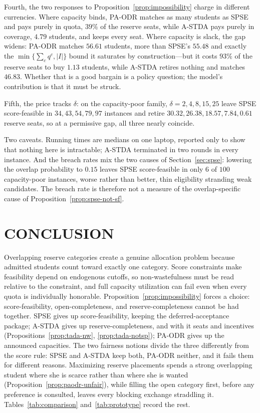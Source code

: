 \documentclass[a4paper,twoside]{article}
\theoremstyle{definition}
\begin{document}
Fourth, the two responses to Proposition~\ref{prop:impossibility} charge in different currencies. Where capacity binds, PA-ODR matches as many students as SPSE and pays purely in quota, $39\%$ of the reserve seats, while A-STDA pays purely in coverage, $4.79$ students, and keeps every seat. Where capacity is slack, the gap widens: PA-ODR matches $56.61$ students, more than SPSE's $55.48$ and exactly the $\min\{\sum_c q^c,|I|\}$ bound it saturates by construction---but it costs $93\%$ of the reserve seats to buy $1.13$ students, while A-STDA retires nothing and matches $46.83$. Whether that is a good bargain is a policy question; the model's contribution is that it must be struck.

Fifth, the price tracks $\delta$: on the capacity-poor family, $\delta=2,4,8,15,25$ leave SPSE score-feasible in $34,43,54,79,97$ instances and retire $30.32,26.38,18.57,7.84,0.61$ reserve seats, so at a permissive gap, all three nearly coincide.

Two caveats. Running times are medians on one laptop, reported only to show that nothing here is intractable; A-STDA terminated in two rounds in every instance. And the breach rates mix the two causes of Section~\ref{sec:spse}: lowering the overlap probability to $0.15$ leaves SPSE score-feasible in only $6$ of $100$ capacity-poor instances, worse rather than better, thin eligibility stranding weak candidates. The breach rate is therefore not a measure of the overlap-specific cause of Proposition~\ref{prop:spse-not-sf}.

\section{\uppercase{Conclusion}}

Overlapping reserve categories create a genuine allocation problem because admitted students count toward exactly one category. Score constraints make feasibility depend on endogenous cutoffs, so non-wastefulness must be read relative to the constraint, and full capacity utilization can fail even when every quota is individually honorable. Proposition~\ref{prop:impossibility} forces a choice: score-feasibility, open-completeness, and reserve-completeness cannot be had together. SPSE gives up score-feasibility, keeping the deferred-acceptance package; A-STDA gives up reserve-completeness, and with it seats and incentives (Propositions~\ref{prop:tada-nw}, \ref{prop:tada-notsp}); PA-ODR gives up the announced capacities. The two fairness notions divide the three differently from the score rule: SPSE and A-STDA keep both, PA-ODR neither, and it fails them for different reasons. Maximizing reserve placements spends a strong overlapping student where she is scarce rather than where she is wanted (Proposition~\ref{prop:paodr-unfair}), while filling the open category first, before any preference is consulted, leaves every blocking exchange straddling it. Tables~\ref{tab:comparison} and~\ref{tab:prototype} record the rest.
\end{document}
